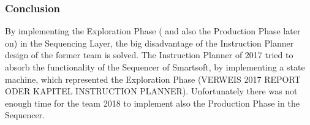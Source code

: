 \subsubsection{Conclusion }

By implementing the Exploration Phase ( and also the Production Phase later on) in the Sequencing Layer, the big disadvantage of the Instruction Planner design of the former team is solved. The Instruction Planner of 2017 tried to absorb the functionality of the Sequencer of Smartsoft, by implementing a state machine, which represented the Exploration Phase (VERWEIS 2017 REPORT ODER KAPITEL INSTRUCTION PLANNER).
Unfortunately there was not enough time for the team 2018 to implement also the Production Phase in the Sequencer.


